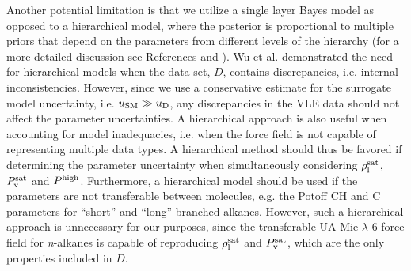 \documentclass[preprint,letterpaper,floatfix,citeautoscript,aip,jcp]{revtex4-1}
\begin{document}
Another potential limitation is that we utilize a single layer Bayes model as opposed to a hierarchical model, where the posterior is proportional to multiple priors that depend on the parameters from different levels of the hierarchy (for a more detailed discussion see References  and ). Wu et al. demonstrated the need for hierarchical models when the data set, $D$, contains discrepancies, i.e. internal inconsistencies. 
However, since we use a conservative estimate for the surrogate model uncertainty, i.e. $u_{\rm SM} \gg u_{\rm D}$, any discrepancies in the VLE data should not affect the parameter uncertainties. 
A hierarchical approach is also useful when accounting for model inadequacies, i.e. when the force field is not capable of representing multiple data types. A hierarchical method should thus be favored if determining the parameter uncertainty when simultaneously considering $\rho_{\rm l}^{\rm sat}$, $P_{\rm v}^{\rm sat}$ and $P^{\rm high}$. Furthermore, a hierarchical model should be used if the parameters are not transferable between molecules, e.g. the Potoff CH and C parameters for ``short'' and ``long'' branched alkanes. However, such a hierarchical approach is unnecessary for our purposes, since the transferable UA Mie $\lambda$-6 force field for \textit{n}-alkanes is capable of reproducing $\rho_{\rm l}^{\rm sat}$ and $P_{\rm v}^{\rm sat}$, which are the only properties included in $D$.
\end{document}
